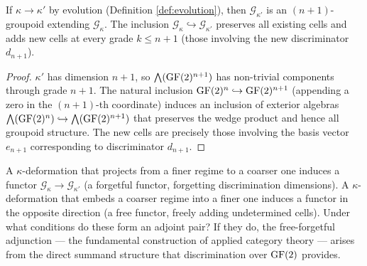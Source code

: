 \begin{proposition}\label{prop:growth}
If $\kappa \to \kappa'$ by evolution (Definition
\ref{def:evolution}), then $\mathcal{G}_{\kappa'}$ is an
$(n+1)$-groupoid extending $\mathcal{G}_\kappa$. The
inclusion $\mathcal{G}_\kappa \hookrightarrow
\mathcal{G}_{\kappa'}$ preserves all existing cells and
adds new cells at every grade $k \leq n+1$ (those involving
the new discriminator $d_{n+1}$).
\end{proposition}

\begin{proof}
$\kappa'$ has dimension $n+1$, so
$\bigwedge(\operatorname{GF}(2)^{n+1})$ has non-trivial components through
grade $n+1$. The natural inclusion
$\operatorname{GF}(2)^n \hookrightarrow \operatorname{GF}(2)^{n+1}$ (appending a zero
in the $(n+1)$-th coordinate) induces an inclusion of
exterior algebras
$\bigwedge(\operatorname{GF}(2)^n) \hookrightarrow \bigwedge(\operatorname{GF}(2)^{n+1})$
that preserves the wedge product and hence all groupoid
structure. The new cells are precisely those involving the
basis vector $e_{n+1}$ corresponding to discriminator
$d_{n+1}$.
\end{proof}

\begin{openquestion}
A $\kappa$-deformation that projects from a finer regime to
a coarser one induces a functor
$\mathcal{G}_\kappa \to \mathcal{G}_{\kappa'}$ (a forgetful
functor, forgetting discrimination dimensions). A
$\kappa$-deformation that embeds a coarser regime into a
finer one induces a functor in the opposite direction (a
free functor, freely adding undetermined cells). Under what
conditions do these form an adjoint pair? If they do, the
free-forgetful adjunction --- the fundamental construction
of applied category theory --- arises from the direct
summand structure that discrimination over $\operatorname{GF}(2)$
provides.
\end{openquestion}

